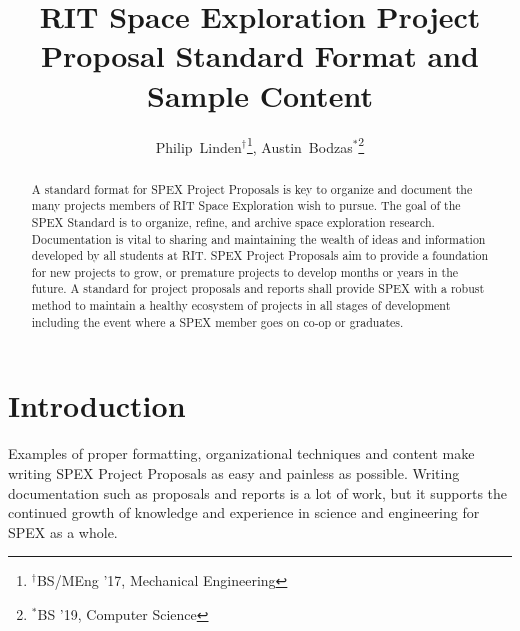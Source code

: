 \documentclass[journal]{SPEXformat}
\title{RIT Space Exploration Project Proposal Standard Format and Sample Content}
\author{
  Philip~Linden$^{\dagger}$\thanks{$^{\dagger}$BS/MEng '17, Mechanical Engineering},
  Austin~Bodzas$^{*}$\thanks{$^{*}$BS '19, Computer Science}
}
\begin{document}
\maketitle

\begin{abstract}
A standard format for SPEX Project Proposals is key to organize and document the many projects members of RIT Space Exploration wish to pursue. The goal of the SPEX Standard is to organize, refine, and archive space exploration research.
Documentation is vital to sharing and maintaining the wealth of ideas and information developed by all students at RIT.\@
SPEX Project Proposals aim to provide a foundation for new projects to grow, or premature projects to develop months or years in the future.
A standard for project proposals and reports shall provide SPEX with a robust method to maintain a healthy ecosystem of projects in all stages of development including the event where a SPEX member goes on co-op or graduates.
\end{abstract}

\label{sec:nomenclature}

\printnomenclature{}

\section{Introduction}
\label{sec:introduction}
Examples of proper formatting, organizational techniques and content make writing SPEX Project Proposals as easy and painless as possible.
Writing documentation such as proposals and reports is a lot of work, but it supports the continued growth of knowledge and experience in science and engineering for SPEX as a whole.
\end{document}
